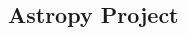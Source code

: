 \documentclass[10pt]{article}
\begin{document}
\begin{myposter}
\begin{myshadowfixed}{375.3mm}{60mm}
\begin{center}
\begin{minipage}[c]{290mm}
\begin{center}
\end{center}
\end{minipage}\hspace*{5mm}%
\begin{minipage}[c]{35mm}
\begin{center}\end{center}%
\end{minipage}\vspace*{2mm}

\vfill
\end{center}\end{myshadowfixed}
%
%
\vspace*{5mm}%
%
%
\begin{myshadowfixed}{112mm}{145mm}

\section*{Astropy Project}

\vfill
\end{myshadowfixed}\hspace*{4mm}%
%
%
\begin{myshadowfixed}{112mm}{145mm}


\end{myshadowfixed}
\end{myposter}
\end{document}
